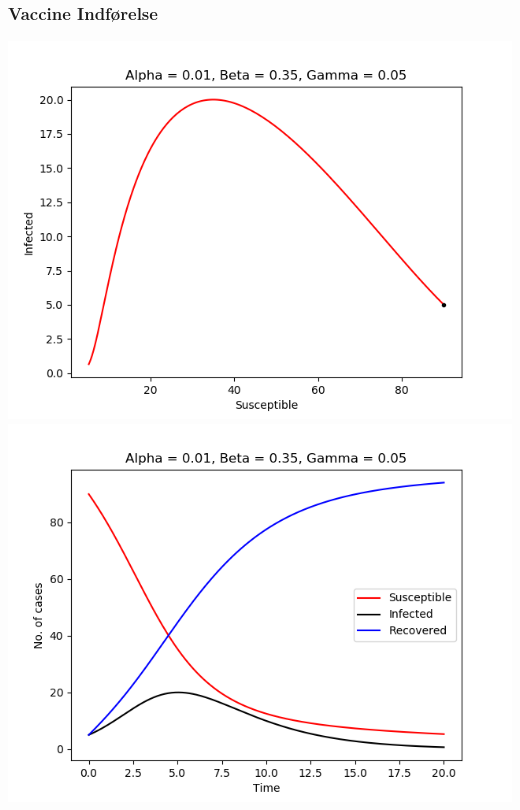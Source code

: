 \begin{frame}
\frametitle{Vaccine Indførelse}
\includegraphics[scale=0.295]{img/a1_b35_g5.png}
\includegraphics[scale=0.295]{img/t_a1_b35_g5.png}
\end{frame}
%
